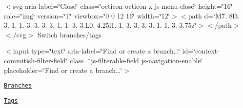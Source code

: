  

   $<$svg aria-\/label=\char`\"{}\+Close\char`\"{} class=\char`\"{}octicon octicon-\/x js-\/menu-\/close\char`\"{} height=\char`\"{}16\char`\"{} role=\char`\"{}img\char`\"{} version=\char`\"{}1.\char`\"{} viewbox=\char`\"{}0 0 12 16\char`\"{} width=\char`\"{}12\char`\"{}$>$$<$path d=\char`\"{}\+M7. 8l3. 3.-\/1. 1.-\/3.-\/3.-\/3. 3.-\/1.-\/1. 3.-\/3.\+L0. 4.\+25l1.-\/1. 3. 3. 3.-\/3. 1. 1.-\/3. 3.\+75z\char`\"{}$>$$<$/path$>$$<$/svg$>$ Switch branches/tags 

   $<$input type=\char`\"{}text\char`\"{} aria-\/label=\char`\"{}\+Find or create a branch…\char`\"{} id=\char`\"{}context-\/commitish-\/filter-\/field\char`\"{} class=\char`\"{}js-\/filterable-\/field js-\/navigation-\/enable\char`\"{} placeholder=\char`\"{}\+Find or create a branch…\char`\"{}$>$   
\begin{DoxyItemize}
\item \href{#}{\tt Branches}  
\item \href{#}{\tt Tags}  
\end{DoxyItemize} 

 

 

